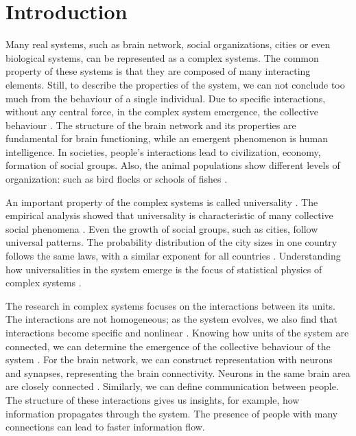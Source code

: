 \chapter{Introduction} %

Many real systems, such as brain network, social organizations, cities or even biological systems, can be represented as a complex systems. The common property of these systems is that they are composed of many interacting elements. Still, to describe the properties of the system, we can not conclude too much from the behaviour of a single individual. Due to specific interactions, without any central force, in the complex system emergence, the collective behaviour \cite{kwapien2012}. The structure of the brain network and its properties are fundamental for brain functioning, while an emergent phenomenon is human intelligence. In societies, people's interactions lead to civilization, economy, formation of social groups. Also, the animal populations show different levels of organization: such as bird flocks or schools of fishes \cite{thurner2018}.

An important property of the complex systems is called universality \cite{binney1992}. The empirical analysis showed that universality is characteristic of many collective social phenomena  \cite{chatterjee2013, radicchi2008}. Even the growth of social groups, such as cities, follow universal patterns. The probability distribution of the city sizes in one country follows the same laws, with a similar exponent for all countries \cite{barthelemy2019}. Understanding how universalities in the system emerge is the focus of statistical physics of complex systems \cite{verbavatz2020}. 

The research in complex systems focuses on the interactions between its units. The interactions are not homogeneous; as the system evolves, we also find that interactions become specific and nonlinear \cite{thurner2018}. Knowing how units of the system are connected, we can determine the emergence of the collective behaviour of the system \cite{ladyman2013}. For the brain network, we can construct representation with neurons and synapses, representing the brain connectivity. Neurons in the same brain area are closely connected \cite{latora2017complex}.
Similarly, we can define communication between people. The structure of these interactions gives us insights, for example, how information propagates through the system. The presence of people with many connections can lead to faster information flow. 

